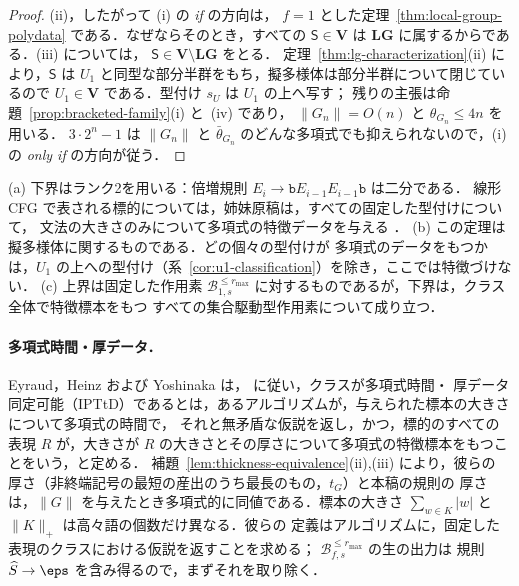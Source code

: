 \begin{proof}
(ii)，したがって (i) の \emph{if} の方向は，
$f=1$ とした定理~\ref{thm:local-group-polydata} である．なぜならそのとき，すべての
$\mathsf S\in\mathbf V$ は $\mathbf{LG}$ に属するからである．(iii) については，
$\mathsf S\in\mathbf V\setminus\mathbf{LG}$ をとる．
定理~\ref{thm:lg-characterization}(ii) により，$\mathsf S$ は
$U_1$ と同型な部分半群をもち，擬多様体は部分半群について閉じているので
$U_1\in\mathbf V$ である．型付け $s_U$ は $U_1$ の上へ写す；
残りの主張は命題~\ref{prop:bracketed-family}(i) と~(iv) であり，
$\|G_n\|=O(n)$ と $\theta_{G_n}\le4n$ を用いる．
$3\cdot2^n-1$ は $\|G_n\|$ と
$\bar\theta_{G_n}$ のどんな多項式でも抑えられないので，(i) の \emph{only if} の方向が従う．
\end{proof}

\begin{remark}
\label{rem:fanout-one-data}
(a) 下界はランク2を用いる：倍増規則
$E_i\to\mathtt bE_{i-1}E_{i-1}\mathtt b$ は二分である．
線形 CFG で表される標的については，姉妹原稿は，すべての固定した型付けについて，
文法の大きさのみについて多項式の特徴データを与える
\cite[Theorem~8.3]{kuriyamaCFG}．
(b) この定理は擬多様体に関するものである．どの個々の型付けが
多項式のデータをもつかは，$U_1$ の上への型付け（系~\ref{cor:u1-classification}）を除き，ここでは特徴づけない．
(c) 上界は固定した作用素
$\mathcal B^{\le r_{\max}}_{1,s}$ に対するものであるが，下界は，クラス全体で特徴標本をもつ
すべての集合駆動型作用素について成り立つ．
\end{remark}

\paragraph{多項式時間・厚データ．}
Eyraud，Heinz および Yoshinaka \cite[Definition~2.12]{EyraudHeinzYoshinaka2016} は，
\cite{Yoshinaka2008} に従い，クラスが多項式時間・
厚データ同定可能（IPTtD）であるとは，あるアルゴリズムが，与えられた標本の大きさについて多項式の時間で，
それと無矛盾な仮説を返し，かつ，標的のすべての表現 $R$
が，大きさが $R$ の大きさとその厚さについて多項式の特徴標本をもつことをいう，と定める．
補題~\ref{lem:thickness-equivalence}(ii),(iii) により，彼らの
厚さ（非終端記号の最短の産出のうち最長のもの，$t_G$）と本稿の規則の
厚さは，$\|G\|$ を与えたとき多項式的に同値である．標本の大きさ
$\sum_{w\in K}|w|$ と $\|K\|_+$ は高々語の個数だけ異なる．彼らの
定義はアルゴリズムに，固定した表現のクラスにおける仮説を返すことを求める；
$\mathcal B^{\le r_{\max}}_{f,s}$ の生の出力は
規則 $\widehat S\to\eps$ を含み得るので，まずそれを取り除く．

